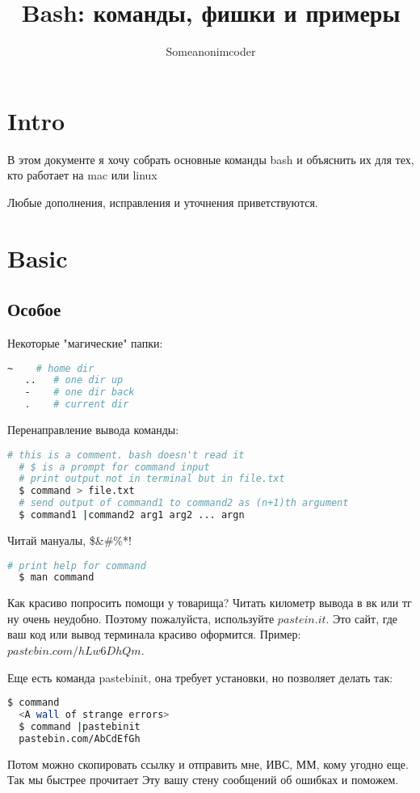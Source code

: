 \documentclass[11pt]{article}
\title{\textbf{Bash: команды, фишки и примеры}}
\author{Someanonimcoder}
\date{}
\begin{document}
\maketitle
\thispagestyle{empty}
\tableofcontents

\section{Intro}
В этом документе я хочу собрать основные команды bash и объяснить их для тех, кто работает на mac или linux

Любые дополнения, исправления и уточнения приветствуются.

\section{Basic}
\subsection{Особое}
Некоторые "магические" папки:
\begin{lstlisting}[language=bash]
   ~    # home dir 
   ..   # one dir up
   -    # one dir back
   .    # current dir
\end{lstlisting}
Перенаправление вывода команды:
\begin{lstlisting}[language=bash]
  # this is a comment. bash doesn't read it
  # $ is a prompt for command input
  # print output not in terminal but in file.txt
  $ command > file.txt     
  # send output of command1 to command2 as (n+1)th argument
  $ command1 |command2 arg1 arg2 ... argn
\end{lstlisting}
Читай мануалы, \$\&\#\%*!
\begin{lstlisting}[language=bash]
  # print help for command
  $ man command     
\end{lstlisting}
Как красиво попросить помощи у товарища? Читать километр вывода в вк или тг ну очень неудобно. Поэтому пожалуйста, используйте $pastein.it$. Это сайт, где ваш код или вывод терминала красиво оформится. Пример: $pastebin.com/hLw6DhQm$.

Еще есть команда pastebinit, она требует установки, но позволяет делать так:
\begin{lstlisting}[language=bash]
  $ command
  <A wall of strange errors>
  $ command |pastebinit
  pastebin.com/AbCdEfGh
\end{lstlisting}
Потом можно скопировать ссылку и отправить мне, ИВС, ММ, кому угодно еще. Так мы быстрее прочитает Эту вашу стену сообщений об ошибках и поможем. 
\end{document}
